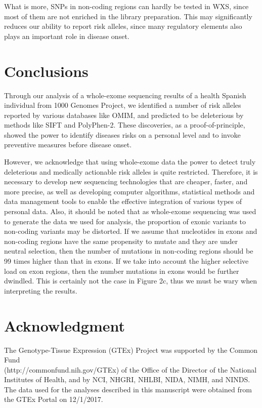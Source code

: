 \documentclass[a4paper, 12pt]{article}
\begin{document}
				What is more, SNPs in non-coding regions can hardly be tested in WXS, since most of them are not enriched in the library preparation. This may significantly reduces our ability to report risk alleles, since many regulatory elements also plays an important role in disease onset.
				
		\section*{Conclusions}
		
			Through our analysis of a whole-exome sequencing results of a health Spanish individual from 1000 Genomes Project, we identified a number of risk alleles reported by various databases like OMIM, and predicted to be deleterious by methods like SIFT and PolyPhen-2. These discoveries, as a proof-of-principle, showed the power to identify diseases risks on a personal level and to invoke preventive measures before disease onset.
			
			However, we acknowledge that using whole-exome data the power to detect truly deleterious and medically actionable risk alleles is quite restricted. Therefore, it is necessary to develop new sequencing technologies that are cheaper, faster, and more precise, as well as developing computer algorithms, statistical methods and data management tools to enable the effective integration of various types of personal data. Also, it should be noted that as whole-exome sequencing was used to generate the data we used for analysis, the proportion of exonic variants to non-coding variants may be distorted. If we assume that nucleotides in exons and non-coding regions have the same propensity to mutate and they are under neutral selection, then the number of mutations in non-coding regions should be 99 times higher than that in exons. If we take into account the higher selective load on exon regions, then the number mutations in exons would be further dwindled. This is certainly not the case in Figure 2c, thus we must be wary when interpreting the results.
			
		\section*{Acknowledgment}
		
			The Genotype-Tissue Expression (GTEx) Project was supported by the Common Fund\\ (http://commonfund.nih.gov/GTEx) of the Office of the Director of the National Institutes of Health, and by NCI, NHGRI, NHLBI, NIDA, NIMH, and NINDS. The data used for the analyses described in this manuscript were obtained from the GTEx Portal on 12/1/2017.
			
\end{document}
